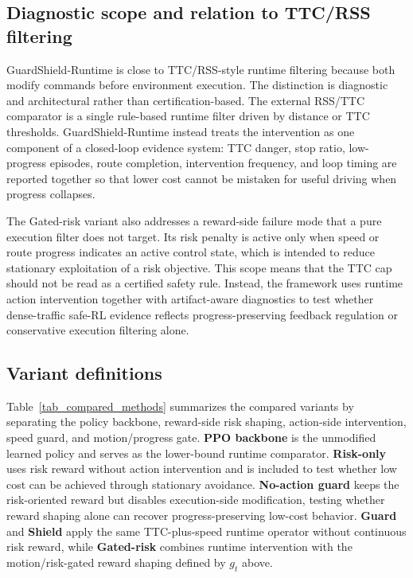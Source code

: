 \documentclass[pdflatex,sn-mathphys-ay]{sn-jnl}
\begin{document}
\subsection{Diagnostic scope and relation to TTC/RSS filtering}\label{sec_not_only_ttc}
GuardShield-Runtime is close to TTC/RSS-style runtime filtering because both modify commands before environment execution. The distinction is diagnostic and architectural rather than certification-based. The external RSS/TTC comparator is a single rule-based runtime filter driven by distance or TTC thresholds. GuardShield-Runtime instead treats the intervention as one component of a closed-loop evidence system: TTC danger, stop ratio, low-progress episodes, route completion, intervention frequency, and loop timing are reported together so that lower cost cannot be mistaken for useful driving when progress collapses.

The Gated-risk variant also addresses a reward-side failure mode that a pure execution filter does not target. Its risk penalty is active only when speed or route progress indicates an active control state, which is intended to reduce stationary exploitation of a risk objective. This scope means that the TTC cap should not be read as a certified safety rule. Instead, the framework uses runtime action intervention together with artifact-aware diagnostics to test whether dense-traffic safe-RL evidence reflects progress-preserving feedback regulation or conservative execution filtering alone.

\subsection{Variant definitions}\label{sec_variants}
Table~\ref{tab_compared_methods} summarizes the compared variants by separating the policy backbone, reward-side risk shaping, action-side intervention, speed guard, and motion/progress gate. \textbf{PPO backbone} is the unmodified learned policy and serves as the lower-bound runtime comparator. \textbf{Risk-only} uses risk reward without action intervention and is included to test whether low cost can be achieved through stationary avoidance. \textbf{No-action guard} keeps the risk-oriented reward but disables execution-side modification, testing whether reward shaping alone can recover progress-preserving low-cost behavior. \textbf{Guard} and \textbf{Shield} apply the same TTC-plus-speed runtime operator without continuous risk reward, while \textbf{Gated-risk} combines runtime intervention with the motion/risk-gated reward shaping defined by $g_t$ above.
\end{document}
